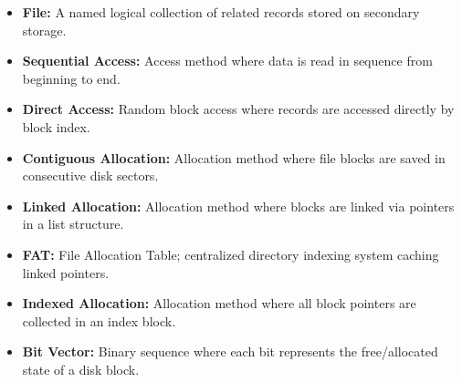 \documentclass[12pt,a4paper]{article}
\begin{document}
\begin{tcolorbox}[defbox, title={\textbf{One-Line Definitions}}]
\begin{itemize}[leftmargin=*, itemsep=2.5pt, topsep=0pt]
  \item \textbf{File:} A named logical collection of related records stored on secondary storage.
  \item \textbf{Sequential Access:} Access method where data is read in sequence from beginning to end.
  \item \textbf{Direct Access:} Random block access where records are accessed directly by block index.
  \item \textbf{Contiguous Allocation:} Allocation method where file blocks are saved in consecutive disk sectors.
  \item \textbf{Linked Allocation:} Allocation method where blocks are linked via pointers in a list structure.
  \item \textbf{FAT:} File Allocation Table; centralized directory indexing system caching linked pointers.
  \item \textbf{Indexed Allocation:} Allocation method where all block pointers are collected in an index block.
  \item \textbf{Bit Vector:} Binary sequence where each bit represents the free/allocated state of a disk block.
\end{itemize}
\end{tcolorbox}
\end{document}
